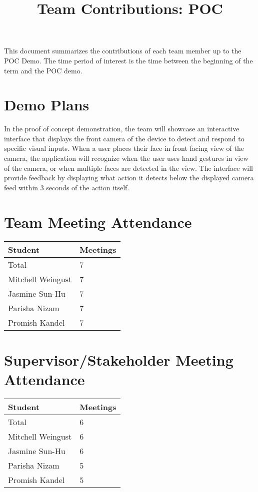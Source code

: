 \documentclass{article}
\title{Team Contributions: POC\\\progname}
\author{\authname}
\date{}
\begin{document}
\maketitle

This document summarizes the contributions of each team member up to the POC
Demo.  The time period of interest is the time between the beginning of the term
and the POC demo.

\section{Demo Plans}

\hspace{2em}In the proof of concept demonstration, the team will showcase an interactive interface that displays the front 
camera of the device to detect and respond to specific visual inputs. When a user places their face in front 
facing view of the camera, the application will recognize when the user uses hand gestures in view of the camera, 
or when multiple faces are detected in the view. The interface will provide feedback by displaying what action it 
detects below the displayed camera feed within 3 seconds of the action itself. 

\section{Team Meeting Attendance}

\begin{table}[H]
\centering
\begin{tabular}{ll}
\toprule
\textbf{Student} & \textbf{Meetings}\\
\midrule
Total & 7\\
Mitchell Weingust & 7\\
Jasmine Sun-Hu & 7\\
Parisha Nizam & 7\\
Promish Kandel & 7\\
\bottomrule
\end{tabular}
\end{table}

\section{Supervisor/Stakeholder Meeting Attendance}

\begin{table}[H]
\centering
\begin{tabular}{ll}
\toprule
\textbf{Student} & \textbf{Meetings}\\
\midrule
Total & 6\\
Mitchell Weingust & 6\\
Jasmine Sun-Hu & 6\\
Parisha Nizam & 5\\
Promish Kandel & 5\\
\bottomrule
\end{tabular}
\end{table}
\end{document}
